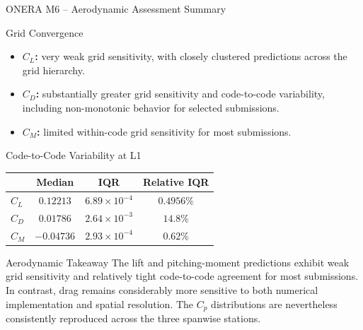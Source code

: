 
\begin{frame}{\small ONERA M6 -- Aerodynamic Assessment Summary}
\scriptsize

\begin{block}{\scriptsize Grid Convergence}
\begin{itemize}
    \item \textbf{$C_L$:} very weak grid sensitivity, with closely clustered predictions across the grid hierarchy.
    \item \textbf{$C_D$:} substantially greater grid sensitivity and code-to-code variability, including non-monotonic behavior for selected submissions.
    \item \textbf{$C_M$:} limited within-code grid sensitivity for most submissions.
\end{itemize}
\end{block}

\vspace{0.15cm}

\begin{block}{\scriptsize Code-to-Code Variability at L1}
\begin{center}
\begin{tabular}{lccc}
\toprule
 & \textbf{Median} & \textbf{IQR} & \textbf{Relative IQR} \\
\midrule
$C_L$ & $0.12213$  & $6.89\times10^{-4}$ & $0.4956\%$ \\
$C_D$ & $0.01786$  & $2.64\times10^{-3}$ & $14.8\%$ \\
$C_M$ & $-0.04736$ & $2.93\times10^{-4}$ & $0.62\%$ \\
\bottomrule
\end{tabular}
\end{center}
\end{block}

\vspace{0.15cm}

\begin{alertblock}{\scriptsize Aerodynamic Takeaway}
The lift and pitching-moment predictions exhibit weak grid sensitivity and relatively tight code-to-code agreement for most submissions. In contrast, drag remains considerably more sensitive to both numerical implementation and spatial resolution. The $C_p$ distributions are nevertheless consistently reproduced across the three spanwise stations.
\end{alertblock}

\end{frame}


